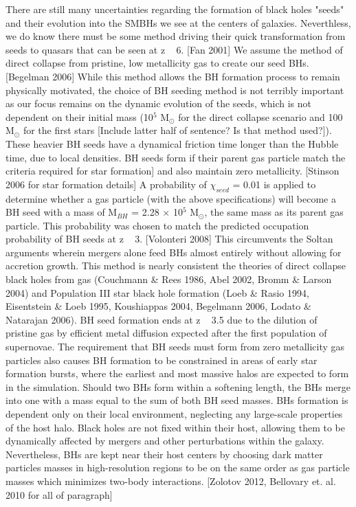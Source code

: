 \documentclass[manuscript]{aastex}
\begin{document}
	There are still many uncertainties regarding the formation of black holes "seeds" and their evolution into the SMBHs we see at the centers of galaxies. Neverthless, we do know there must be some method driving their quick transformation from seeds to quasars that can be seen at z ~ 6. [Fan 2001] We assume the method of direct collapse from pristine, low metallicity gas to create our seed BHs. [Begelman 2006] While this method allows the BH formation process to remain physically motivated, the choice of BH seeding method is not terribly important as our focus remains on the dynamic evolution of the seeds, which is not dependent on their initial mass (10$^5$ M$_{\odot}$ for the direct collapse scenario and 100 M$_{\odot}$ for the first stars [Include latter half of sentence? Is that method used?]). These heavier BH seeds have a dynamical friction time longer than the Hubble time, due to local densities. BH seeds form if their parent gas particle match the criteria required for star formation] and also maintain zero metallicity. [Stinson 2006 for star formation details] A probability of $\chi_{seed}$ = 0.01 is applied to determine whether a gas particle (with the above specifications) will become a BH seed with a mass of M$_{BH}$ = 2.28 $\times$ 10$^5$ M$_{\odot}$, the same mass as its parent gas particle. This probability was chosen to match the predicted occupation probability of BH seeds at z ~ 3. [Volonteri 2008] This circumvents the Soltan arguments wherein mergers alone feed BHs almost entirely without allowing for accretion growth. This method is nearly consistent the theories of direct collapse black holes from gas (Couchmann \& Rees 1986, Abel 2002, Bromm \& Larson 2004) and Population III star black hole formation (Loeb \& Rasio 1994, Eisentstein \& Loeb 1995, Koushiappas 2004, Begelmann 2006, Lodato \& Natarajan 2006). BH seed formation ends at z ~ 3.5 due to the dilution of pristine gas by efficient metal diffusion expected after the first population of supernovae. The requirement that BH seeds must form from zero metallicity gas particles also causes BH formation to be constrained in areas of early star formation bursts, where the earliest and most massive halos are expected to form in the simulation. Should two BHs form within a softening length, the BHs merge into one with a mass equal to the sum of both BH seed masses. BHs formation is dependent only on their local environment, neglecting any large-scale properties of the host halo. Black holes are not fixed within their host, allowing them to be dynamically affected by mergers and other perturbations within the galaxy. Nevertheless, BHs are kept near their host centers by choosing dark matter particles masses in high-resolution regions to be on the same order as gas particle masses which minimizes two-body interactions. [Zolotov 2012, Bellovary et. al. 2010 for all of paragraph]
\end{document}
